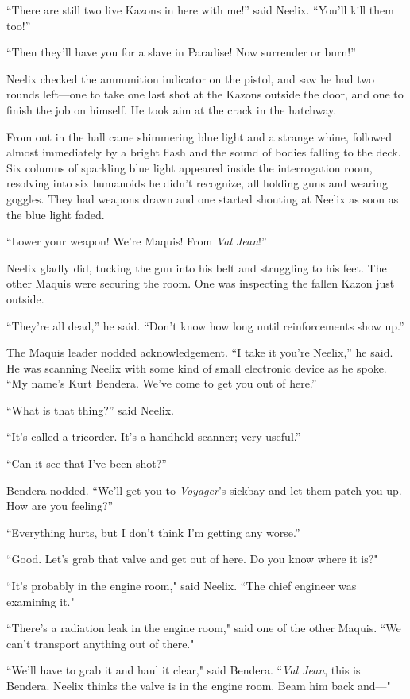 \documentclass[twoside,letterpaper,12pt]{memoir}
\begin{document}
``There are still two live Kazons in here with me!” said Neelix. ``You’ll kill them too!”

``Then they’ll have you for a slave in Paradise! Now surrender or burn!”

Neelix checked the ammunition indicator on the pistol, and saw he had two rounds left—one to take one last shot at the Kazons outside the door, and one to finish the job on himself. He took aim at the crack in the hatchway.

From out in the hall came shimmering blue light and a strange whine, followed almost immediately by a bright flash and the sound of bodies falling to the deck. Six columns of sparkling blue light appeared inside the interrogation room, resolving into six humanoids he didn’t recognize, all holding guns and wearing goggles. They had weapons drawn and one started shouting at Neelix as soon as the blue light faded.

``Lower your weapon! We’re Maquis! From \textit{Val Jean}!”

Neelix gladly did, tucking the gun into his belt and struggling to his feet. The other Maquis were securing the room. One was inspecting the fallen Kazon just outside.

``They’re all dead,” he said. ``Don’t know how long until reinforcements show up.”

The Maquis leader nodded acknowledgement. ``I take it you’re Neelix,” he said. He was scanning Neelix with some kind of small electronic device as he spoke. ``My name’s Kurt Bendera. We’ve come to get you out of here.”

``What is that thing?” said Neelix.

``It’s called a tricorder. It’s a handheld scanner; very useful.”

``Can it see that I’ve been shot?”

Bendera nodded. ``We’ll get you to \textit{Voyager}’s sickbay and let them patch you up. How are you feeling?”

``Everything hurts, but I don’t think I’m getting any worse.”

``Good. Let's grab that valve and get out of here. Do you know where it is?"

``It's probably in the engine room," said Neelix. ``The chief engineer was examining it."

``There's a radiation leak in the engine room," said one of the other Maquis. ``We can't transport anything out of there."

``We'll have to grab it and haul it clear," said Bendera. ``\textit{Val Jean}, this is Bendera. Neelix thinks the valve is in the engine room. Beam him back and---"
\end{document}
